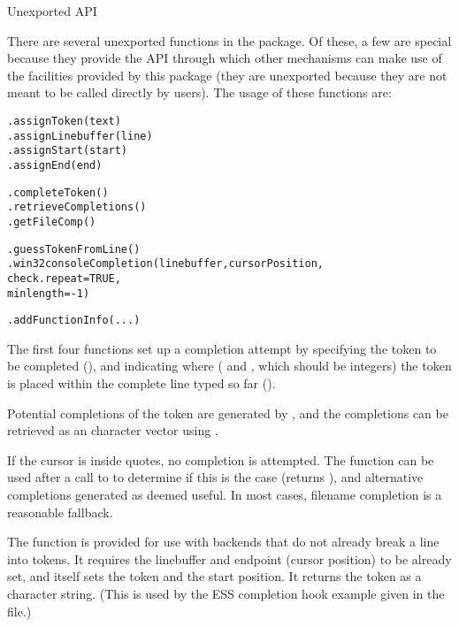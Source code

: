 \begin{Section}{Unexported API}

There are several unexported functions in the package.  Of these, 
a few are special because they provide the API through which other
mechanisms can make use of the facilities provided by this package
(they are unexported because they are not meant to be called directly
by users).  The usage of these functions are:

\begin{alltt}    .assignToken(text)
    .assignLinebuffer(line)
    .assignStart(start)
    .assignEnd(end)

    .completeToken()
    .retrieveCompletions()
    .getFileComp()

    .guessTokenFromLine()
    .win32consoleCompletion(linebuffer, cursorPosition,
                            check.repeat = TRUE, 
                            minlength = -1)

    .addFunctionInfo(...)
\end{alltt}


The first four functions set up a completion attempt by specifying the
token to be completed (), and indicating where
( and , which should be integers) the token is
placed within the complete line typed so far ().

Potential completions of the token are generated by
, and the completions can be retrieved as an \R{}
character vector using .

If the cursor is inside quotes, no completion is attempted.  The
function  can be used after a call to
 to determine if this is the case (returns
), and alternative completions generated as deemed useful.
In most cases, filename completion is a reasonable fallback.

The  function is provided for use with
backends that do not already break a line into tokens.  It requires
the linebuffer and endpoint (cursor position) to be already set, and
itself sets the token and the start position.  It returns the token as
a character string.  (This is used by the ESS completion hook example
given in the  file.)


\end{Section}
